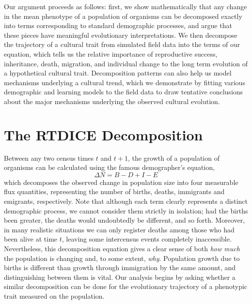 Our argument proceeds as follows: first, we show mathematically that any change in the mean phenotype of a population of organisms can be decomposed exactly into terms corresponding to standard demographic processes, and argue that these pieces have meaningful evolutionary interpretations. We then decompose the trajectory of a cultural trait from simulated field data into the terms of our equation, which tells us the relative importance of reproductive success, inheritance, death, migration, and individual change to the long term evolution of a hypothetical cultural trait.  Decomposition patterns can also help us model mechanisms underlying a cultural trend, which we demonstrate by fitting various demographic and learning models to the field data to draw tentative conclusions about the major mechanisms underlying the observed cultural evolution.  

\section{The RTDICE Decomposition}

Between any two census times $t$ and $t+1$, the growth of a population of organisms can be calculated using the famous demographer's equation,
\begin{equation} \label{eq:demo}
\Delta N = B - D + I - E
\end{equation}
which decomposes the observed change in population size into four measurable flux quantities, representing the number of births, deaths, immigrants and emigrants, respectively.  Note that although each term clearly represents a distinct demographic process, we cannot consider them strictly in isolation; had the births been greater, the deaths would undoubtedly be different, and so forth.  Moreover, in many realistic situations we can only register deaths among those who had been alive at time $t$, leaving some intercensus events completely inaccessible.  Nevertheless, this decomposition equation gives a clear sense of both \textit{how much} the population is changing and, to some extent, \textit{why}.  Population growth due to births is different than growth through immigration by the same amount, and distinguishing between them is vital.  Our analysis begins by asking whether a similar decomposition can be done for the evolutionary trajectory of a phenotypic trait measured on the population.

